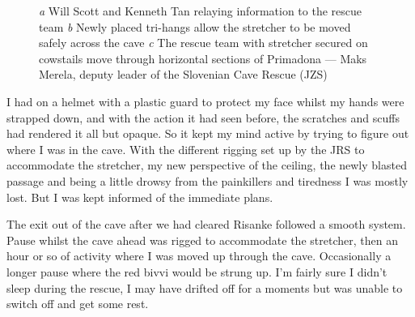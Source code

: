 \begin{figure}[t!]
         \vspace{0.3cm}

        \begin{subfigure}[t]{\textwidth}
            \centering
            \caption{} \label{stretcher moved}
        \end{subfigure}

            \caption{
            \emph{a} Will Scott and Kenneth Tan relaying information to the rescue team
            \emph{b} Newly placed tri-hangs allow the stretcher to be moved safely across the cave
            \emph{c} The rescue team with stretcher secured on cowstails move through horizontal sections of Primadona --- Maks Merela, deputy leader of the Slovenian Cave Rescue (JZS)}
    \end{figure}


    I had on a helmet with a plastic guard to protect my face whilst my hands were strapped down, and with the action it had seen before, the scratches and scuffs had rendered it all but opaque. So it kept my mind active by trying to figure out where I was in the cave. With the different rigging set up by the JRS to accommodate the stretcher, my new perspective of the ceiling, the newly blasted passage and being a little drowsy from the painkillers and tiredness I was mostly lost. But I was kept informed of the immediate plans.

    The exit out of the cave after we had cleared Risanke followed a smooth system. Pause whilst the cave ahead was rigged to accommodate the stretcher, then an hour or so of activity where I was moved up through the cave. Occasionally a longer pause where the red bivvi would be strung up. I’m fairly sure I didn’t sleep during the rescue, I may have drifted off for a moments but was unable to switch off and get some rest.

